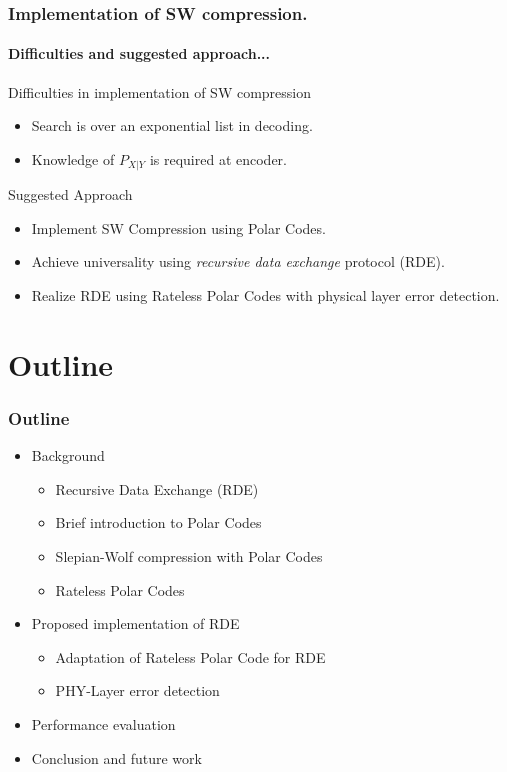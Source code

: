 \documentclass[xcolor=dvipsnames]{beamer}
\begin{document}
\begin{frame}
\frametitle{Implementation of SW compression.}
\framesubtitle{ Difficulties and suggested approach...}
Difficulties in implementation of SW compression
\begin{itemize}
\item Search is over an exponential list in decoding.
\item Knowledge of $P_{X|Y}$ is required at encoder.
\end{itemize}
\begin{block}{Suggested Approach}
\begin{itemize}
\item{Implement SW Compression using Polar Codes.}
\item{Achieve universality using \emph{recursive data exchange} protocol (RDE).}
\item{Realize RDE using Rateless Polar Codes with physical layer error detection.}
\end{itemize}
\end{block}
\end{frame}

\section{Outline}
\begin{frame}
\frametitle{Outline}
\begin{itemize}
\item Background
\begin{itemize}
\item{Recursive Data Exchange (RDE)}
\item{Brief introduction to Polar Codes}
\item{Slepian-Wolf compression with Polar Codes}
\item{Rateless Polar Codes}
\end{itemize}
\item Proposed implementation of RDE
\begin{itemize}
\item Adaptation of Rateless Polar Code for RDE
\item PHY-Layer error detection
\end{itemize}
\item Performance evaluation
\item Conclusion and future work
\end{itemize}
\end{frame}
\end{document}
